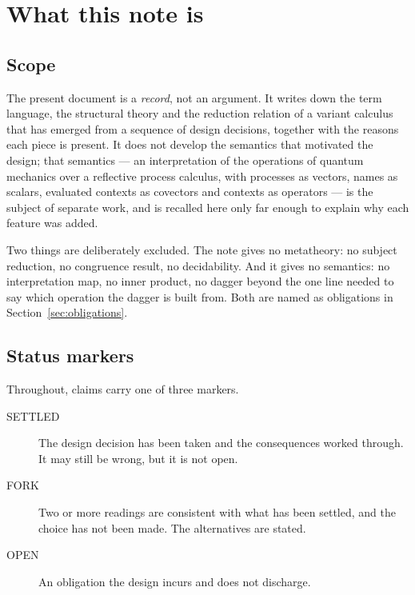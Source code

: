 \documentclass[11pt]{article}
\theoremstyle{definition}
\theoremstyle{remark}
\begin{document}
\tableofcontents

\section{What this note is}

\subsection{Scope}

The present document is a \emph{record}, not an argument. It writes down the
term language, the structural theory and the reduction relation of a variant
calculus that has emerged from a sequence of design decisions, together with
the reasons each piece is present. It does not develop the semantics that
motivated the design; that semantics --- an interpretation of the operations of
quantum mechanics over a reflective process calculus, with processes as
vectors, names as scalars, evaluated contexts as covectors and contexts as
operators --- is the subject of separate work, and is recalled here only far
enough to explain why each feature was added.

Two things are deliberately excluded. The note gives no metatheory: no subject
reduction, no congruence result, no decidability. And it gives no semantics: no
interpretation map, no inner product, no dagger beyond the one line needed to
say which operation the dagger is built from. Both are named as obligations in
Section~\ref{sec:obligations}.

\subsection{Status markers}

Throughout, claims carry one of three markers.

\begin{description}
\item[SETTLED] The design decision has been taken and the consequences worked
  through. It may still be wrong, but it is not open.
\item[FORK] Two or more readings are consistent with what has been settled, and
  the choice has not been made. The alternatives are stated.
\item[OPEN] An obligation the design incurs and does not discharge.
\end{description}
\end{document}
